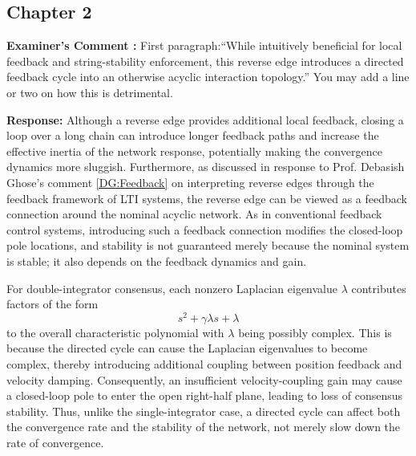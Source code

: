 \documentclass[11pt,a4paper]{article}
\newcounter{examcomment}
\renewcommand{\theexamcomment}{\arabic{examcomment}}
\newcommand{\comment}[1]{%
	\refstepcounter{examcomment}%
	\par\vspace{5pt}\noindent
	\colorbox{gray!13}{%
		\parbox{\dimexpr\linewidth-2\fboxsep}{%
			\textbf{Examiner's Comment \theexamcomment:} #1%
		}%
	}%
	\par
}
\newcommand{\response}{\par\textbf{Response:} }
\newcommand{\revision}{\par\textbf{Proposed thesis revision:} }
\begin{document}
\subsection*{Chapter 2}	
\comment{First paragraph:``While intuitively beneficial for local feedback and string-stability enforcement, this reverse edge introduces a directed feedback cycle into an otherwise acyclic interaction
topology.'' You may add a line or two on how this is detrimental.}
\response
Although a reverse edge provides additional local feedback, closing a loop over a long chain can introduce longer feedback paths and increase the effective inertia of the network response, potentially making the convergence dynamics more sluggish. Furthermore, as discussed in response to Prof. Debasish Ghose's comment \ref{DG:Feedback} on interpreting reverse edges through the feedback framework of LTI systems, the reverse edge can be viewed as a feedback connection around the nominal acyclic network. As in conventional feedback control systems, introducing such a feedback connection modifies the closed-loop pole locations, and stability is not guaranteed merely because the nominal system is stable; it also depends on the feedback dynamics and gain.

For double-integrator consensus, each nonzero Laplacian eigenvalue $\lambda$ contributes factors of the form
\[
s^2+\gamma\lambda s+\lambda
\]
to the overall characteristic polynomial with $\lambda$ being possibly complex. This is because the directed cycle can cause the Laplacian eigenvalues to become complex, thereby introducing additional coupling between position feedback and velocity damping. Consequently, an insufficient velocity-coupling gain may cause a closed-loop pole to enter the open right-half plane, leading to loss of consensus stability. Thus, unlike the single-integrator case, a directed cycle can affect both the convergence rate and the stability of the network, not merely slow down the rate of convergence.
	
	
\end{document}
